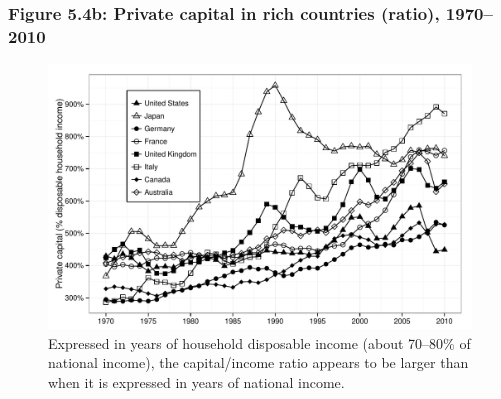 \documentclass[t]{beamer}\usepackage[]{graphicx}\usepackage[]{color}
\newenvironment{knitrout}{}{} %
\begin{document}
\begin{frame}[label=Figure_5_4b]
\frametitle{Figure 5.4b: Private capital in rich countries (ratio), 1970--2010}
\begin{figure}[t]
\begin{minipage}[b]{\textwidth}
\centering
\begin{knitrout}\footnotesize
{}\color{fgcolor}

{\centering \includegraphics[width=1\linewidth]{figures/bw/Figure_5_4b} 

}



\end{knitrout}
\caption{Expressed in years of household disposable income (about 70--80\% of national income), the capital/income ratio appears to be larger than when it is expressed in years of national income.}
\end{minipage}
\end{figure}
\end{frame}
\end{document}
